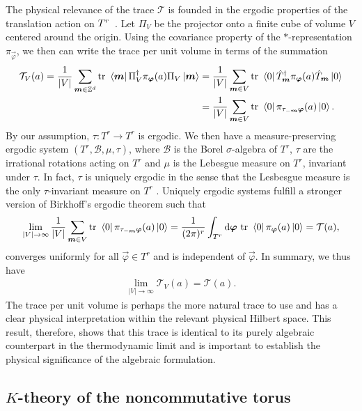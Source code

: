 \documentclass[submission, Phys]{SciPost}
\begin{document}
The physical relevance of the trace $\mathcal{T}$ is founded in the ergodic properties of the translation action on $T^r$~\cite{Prodan2017}.
Let $\Pi_V$ be the projector onto a finite cube of volume $V$ centered around the origin.
Using the covariance property of the $\ast$-representation $\pi_{\vec{\varphi}}$, we then can write the trace per unit volume 
in terms of the summation
\begin{align}
   \mathcal{T}_V(a)= \frac{1}{|V|} \sum_{\boldsymbol{m} \in \mathbb{Z}^d} \mathrm{tr}~ \bra{\boldsymbol{m}} \Pi_V^\dagger \pi_{\boldsymbol{\varphi}}(a) \Pi_V \ket{\boldsymbol{m}}
   &= \frac{1}{|V|} \sum_{\boldsymbol{m} \in V} \mathrm{tr}~ \bra{0} \hat{T}_{\boldsymbol{m}}^\dagger \pi_{\boldsymbol{\varphi}}(a) \hat{T}_{\boldsymbol{m}}\ket{0}
   \\
   &= \frac{1}{|V|} \sum_{\boldsymbol{m} \in V} \mathrm{tr}~ \bra{0} \pi_{ \tau_{-\boldsymbol{m}}\boldsymbol{\varphi}}(a) \ket{0}.
\end{align}
By our assumption, $\tau\colon T^r \to T^r$ is ergodic. We then have a measure-preserving ergodic system $(T^r, \mathscr{B}, \mu, \tau)$, where $\mathscr{B}$ is the Borel $\sigma$-algebra of $T^r$, $\tau$ are the irrational rotations acting on $T^r$ and $\mu$ is the Lebesgue measure on $T^r$, invariant under $\tau$.
In fact, $\tau$ is uniquely ergodic in the sense that the Lesbesgue measure is the only $\tau$-invariant measure on $T^r$ \cite[Def. 4.1.7.]{Katok1995}.
Uniquely ergodic systems fulfill a stronger version of Birkhoff's ergodic theorem \cite[Prop. 4.1.13.]{Katok1995} such that
\begin{align}
    \lim_{|V| \to \infty} \frac{1}{|V|} \sum_{\boldsymbol{m} \in V} \mathrm{tr}~ \bra{0} \pi_{ \tau_{-\boldsymbol{m}}\boldsymbol{\varphi}}(a) \ket{0}
    = 
    \frac{1}{(2\pi)^{r}} \int_{T^r}\mathrm{d} \boldsymbol{\varphi} ~ \mathrm{tr}~ \bra{0} \pi_{ \boldsymbol{\varphi}}(a) \ket{0} = \mathcal{T}(a),
\end{align}
converges uniformly for all $\vec{\varphi} \in T^r$ and is independent of $\vec{\varphi}$.
In summary, we thus have
\begin{align}
    \lim_{|V| \to \infty} \mathcal{T}_V(a) = \mathcal{T}(a).
\end{align}
The trace per unit volume is perhaps the more natural trace to use and has a clear physical interpretation within the relevant physical Hilbert space.
This result, therefore, shows that this trace is identical to its purely algebraic counterpart in the thermodynamic limit and is important to establish the physical significance of the algebraic formulation.

\subsection{\texorpdfstring{$K$}{K}-theory of the noncommutative torus}
\label{subsec:k_theory}
\end{document}
